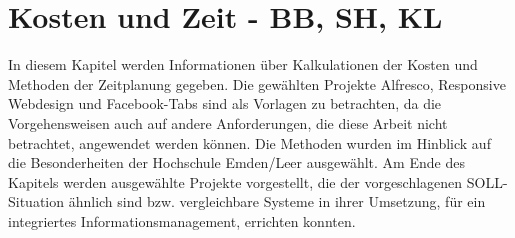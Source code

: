 
\chapter{Kosten und Zeit - BB, SH, KL}

In diesem Kapitel werden Informationen \"uber Kalkulationen der Kosten und Methoden der Zeitplanung gegeben. Die gew\"ahlten Projekte Alfresco, Responsive Webdesign und Facebook-Tabs sind als Vorlagen zu betrachten, da die Vorgehensweisen auch auf andere Anforderungen, die diese Arbeit nicht betrachtet, angewendet werden k\"onnen. Die Methoden wurden im Hinblick auf die Besonderheiten der Hochschule Emden/Leer ausgew\"ahlt. Am Ende des Kapitels werden ausgew\"ahlte Projekte vorgestellt, die der vorgeschlagenen SOLL-Situation \"ahnlich sind bzw. vergleichbare Systeme in ihrer Umsetzung, f\"ur ein integriertes Informationsmanagement, errichten konnten.





\clearpage
